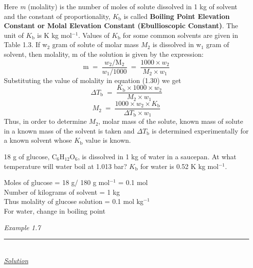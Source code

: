 \documentclass[11pt,a4paper]{article}
\begin{document}
\noindent\hfill\begin{minipage}[t]{0.765\textwidth}
\hspace*{1.5em}Here \textit{m} (molality) is the number of moles of solute dissolved in 1 kg of solvent and the constant of proportionality, $K_\text{b}$ is called \textbf{Boiling Point Elevation Constant or Molal Elevation Constant (Ebullioscopic Constant)}. The unit of $K_\text{b}$ is K kg mol$^{-1}$. Values of $K_\text{b}$ for some common solvents are given in Table 1.3. If w$_2$ gram of solute of molar mass $M_2$ is dissolved in w$_1$ gram of solvent, then molality, m of the solution is given by the expression:
\[ \text{m} \;=\; \frac{w_2/\text{M}_2}{w_1/1000} \;=\; \frac{1000 \times w_2}{M_2 \times w_1} \tag{1.31} \]
\hspace*{1.5em}Substituting the value of molality in equation (1.30) we get
\[ \Delta T_\text{b} \;=\; \frac{K_\text{b} \times 1000 \times w_2}{M_2 \times w_1} \tag{1.32} \]
\[ M_2 \;=\; \frac{1000 \times w_2 \times K_\text{b}}{\Delta T_\text{b} \times w_1} \tag{1.33} \]
\hspace*{1.5em}Thus, in order to determine $M_2$, molar mass of the solute, known mass of solute in a known mass of the solvent is taken and $\Delta T_\text{b}$ is determined experimentally for a known solvent whose $K_\text{b}$ value is known.
\end{minipage}

\vspace{8pt}
\begin{tcolorbox}[enhanced,colback=white,colframe=gray!40,boxrule=0.8pt,bottomrule=0pt,sharp corners=south,arc=2mm,left=8pt,right=24pt,top=4pt,bottom=4pt,boxsep=0pt,overlay={\fill[SkyBlue] ([xshift=-14pt]frame.south east) rectangle (frame.north east);}]
\noindent\begin{minipage}[t]{0.78\linewidth}
18 g of glucose, C$_6$H$_{12}$O$_6$, is dissolved in 1 kg of water in a saucepan. At what temperature will water boil at 1.013 bar? $K_\text{b}$ for water is 0.52 K kg mol$^{-1}$.

\vspace{6pt}
Moles of glucose = 18 g/ 180 g mol$^{-1}$ = 0.1 mol\\
Number of kilograms of solvent = 1 kg\\
Thus molality of glucose solution = 0.1 mol kg$^{-1}$\\
For water, change in boiling point
\end{minipage}\hfill
\begin{minipage}[t]{0.19\linewidth}
{\color{DeepSkyBlue3}\large\itshape Example 1.7}\\[-3pt]
{\color{DeepSkyBlue3}\rule{\linewidth}{0.8pt}}\\[22pt]
{\color{DeepSkyBlue3}\large\itshape\underline{Solution}}
\end{minipage}
\end{tcolorbox}
\end{document}
